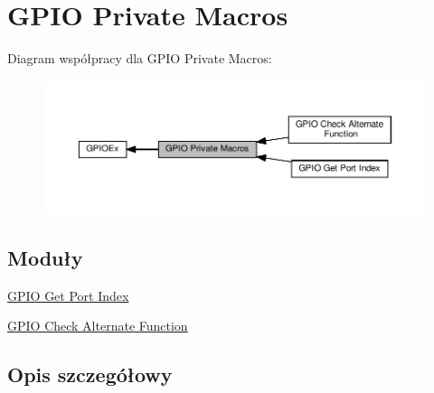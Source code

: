 \hypertarget{group___g_p_i_o_ex___private___macros}{}\section{G\+P\+IO Private Macros}
\label{group___g_p_i_o_ex___private___macros}
Diagram współpracy dla G\+P\+IO Private Macros\+:\nopagebreak
\begin{figure}[H]
\begin{center}
\leavevmode
\includegraphics[width=350pt]{group___g_p_i_o_ex___private___macros}
\end{center}
\end{figure}
\subsection*{Moduły}
\begin{DoxyCompactItemize}
\item 
\hyperlink{group___g_p_i_o_ex___get___port___index}{G\+P\+I\+O Get Port Index}
\item 
\hyperlink{group___g_p_i_o_ex___i_s___alternat__function__selection}{G\+P\+I\+O Check Alternate Function}
\end{DoxyCompactItemize}


\subsection{Opis szczegółowy}
